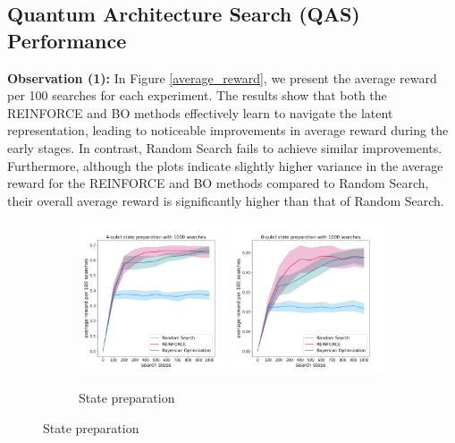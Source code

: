 \documentclass{article} %
\begin{document}
\subsection{Quantum Architecture Search (QAS) Performance}
\label{qas_performance}
\textbf{Observation (1):} In Figure \ref{average_reward}, we present the average reward per 100 searches for each experiment. The results show that both the REINFORCE and BO methods effectively learn to navigate the latent representation, leading to noticeable improvements in average reward during the early stages. In contrast, Random Search fails to achieve similar improvements. Furthermore, although the plots indicate slightly higher variance in the average reward for the REINFORCE and BO methods compared to Random Search, their overall average reward is significantly higher than that of Random Search.
\begin{figure}[ht]
\begin{center}
    \begin{subfigure}[b]{0.325\textwidth}
    \includegraphics[width=0.49\textwidth]{images/4-qubits-fidelity_avg_reward_per_100_with_var_filling.png} %
    \includegraphics[width=0.49\textwidth]{images/8-qubits-fidelity_avg_reward_per_100_with_var_filling.png} %
    \caption{State preparation}
    \label{state_preparation}

\end{subfigure}
\end{center}
\end{figure}
\end{document}
